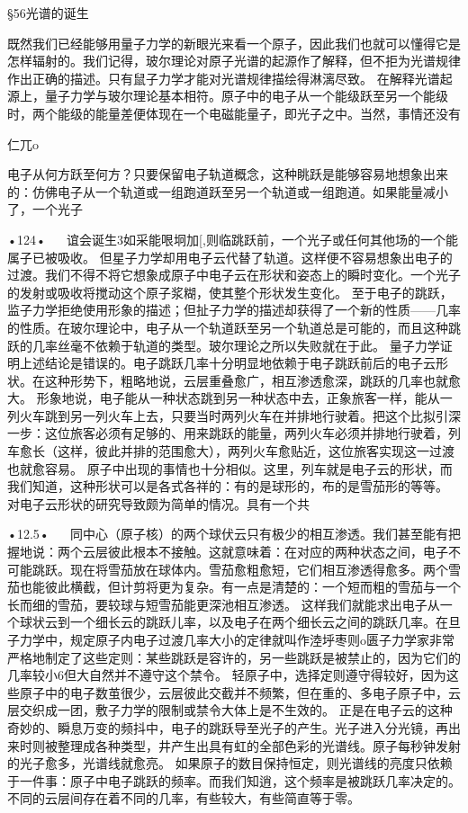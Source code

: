 §56光谱的诞生

既然我们已经能够用量子力学的新眼光来看一个原子，因此我们也就可以懂得它是怎样辐射的。我们记得，玻尔理论对原子光谱的起源作了解释，但不拒为光谱规律作出正确的描述。只有鼠子力学才能对光谱规律描绘得淋漓尽致。
在解释光谱起源上，量子力学与玻尔理论基本相符。原子中的电子从一个能级跃至另一个能级时，两个能级的能量差便体现在一个电磁能量子，即光子之中。当然，事情还没有

仁兀o

电子从何方跃至何方？只要保留电子轨道概念，这种眺跃是能够容易地想象出来的：仿佛电子从一个轨道或一组跑道跃至另一个轨道或一组跑道。如果能量减小了，一个光子

•124•
  
谊会诞生3如采能哏坰加[,则临跳跃前，一个光子或任何其他场的一个能属子已被吸收。
但星子力学却用电子云代替了轨道。这样便不容易想象出电子的过渡。我们不得不将它想象成原子中电子云在形状和姿态上的瞬时变化。一个光子的发射或吸收将搅动这个原子浆糊，使其整个形状发生变化。
至于电子的跳跃，监子力学拒绝使用形象的描述；但扯子力学的描述却获得了一个新的性质——几率的性质。在玻尔理论中，电子从一个轨道跃至另一个轨道总是可能的，而且这种跳跃的几率丝毫不依赖于轨道的类型。玻尔理论之所以失败就在于此。
量子力学证明上述结论是错误的。电子跳跃几率十分明显地依赖于电子跳跃前后的电子云形状。在这种形势下，粗略地说，云层重叠愈广，相互渗透愈深，跳跃的几率也就愈大。
形象地说，电子能从一种状态跳到另一种状态中去，正象旅客一样，能从一列火车跳到另一列火车上去，只要当时两列火车在并排地行驶着。把这个比拟引深一步：这位旅客必须有足够的、用来跳跃的能量，两列火车必须并排地行驶着，列车愈长（这样，彼此并排的范围愈大），两列火车愈贴近，这位旅客实现这一过渡也就愈容易。
原子中出现的事情也十分相似。这里，列车就是电子云的形状，而我们知道，这种形状可以是各式各祥的：有的是球形的，布的是雪茄形的等等。
对电子云形状的研究导致颇为简单的情况。具有一个共

•12.5•
  
同中心（原子核）的两个球伏云只有极少的相互渗透。我们甚至能有把握地说：两个云层彼此根本不接触。这就意味着：在对应的两种状态之间，电子不可能跳跃。现在将雪茄放在球体内。雪茄愈粗愈短，它们相互渗透得愈多。两个雪茄也能彼此横截，但计剪将更为复杂。有一点是清楚的：一个短而粗的雪茄与一个长而细的雪茄，要较球与短雪茄能更深池相互渗透。
这样我们就能求出电子从一个球状云到一个细长云的跳跃儿率，以及电子在两个细长云之间的跳跃几率。在旦子力学中，规定原子内电子过渡几率大小的定律就叫作淕垀枣则o匮子力学家非常严格地制定了这些定则：某些跳跃是容许的，另一些跳跃是被禁止的，因为它们的几率较小6但大自然并不遵守这个禁令。
轻原子中，选择定则遵守得较好，因为这些原子中的电子数茧很少，云层彼此交截并不频繁，但在重的、多电子原子中，云层交织成一团，敷子力学的限制或禁令大体上是不生效的。
正是在电子云的这种奇妙的、瞬息万变的频抖中，电子的跳跃导至光子的产生。光子进入分光镜，再出来时则被整理成各种类型，井产生出具有虹的全部色彩的光谱线。原子每秒钟发射的光子愈多，光谱线就愈亮。
如果原子的数目保持恒定，则光谱线的亮度只依赖于一件事：原子中电子跳跃的频率。而我们知逍，这个频率是被跳跃几率决定的。不同的云层间存在着不同的几率，有些较大，有些简直等于零。

